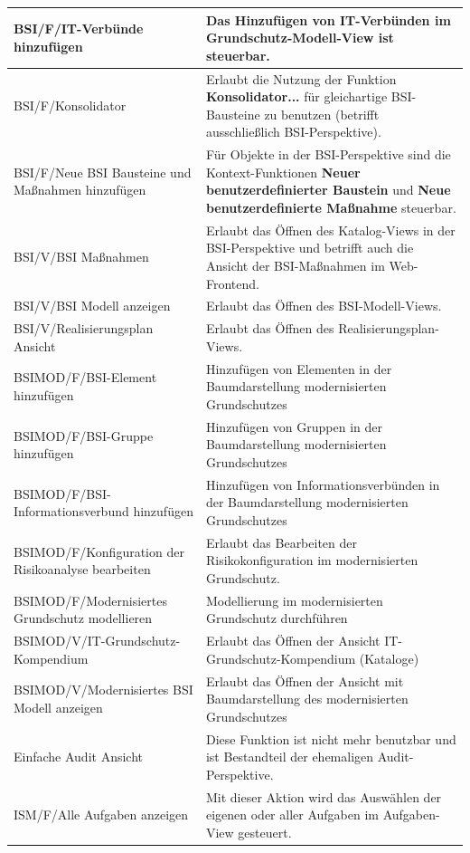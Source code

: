 \documentclass[a4paper,10pt]{book}
\begin{document}
\begin{longtable}{| p{5cm} | p{6cm} |}
BSI/F/IT-Verbünde hinzufügen & Das Hinzufügen von IT-Verbünden im
Grundschutz-Modell-View ist steuerbar. \\[10pt] \hline
BSI/F/Konsolidator & Erlaubt die Nutzung der Funktion \textbf{Konsolidator...}
für gleichartige BSI-Bausteine zu benutzen (betrifft ausschließlich
BSI-Perspektive). \\[10pt] \hline
BSI/F/Neue BSI Bausteine und Maßnahmen hinzufügen & Für Objekte in der
BSI-Perspektive sind die Kontext-Funktionen \textbf{Neuer benutzerdefinierter
Baustein} und \textbf{Neue benutzerdefinierte Maßnahme} steuerbar. \\[10pt]
\hline
BSI/V/BSI Maßnahmen & Erlaubt das Öffnen des Katalog-Views in der
BSI-Perspektive und betrifft auch die Ansicht der BSI-Maßnahmen im
Web-Frontend. \\[10pt] \hline
BSI/V/BSI Modell anzeigen & Erlaubt das Öffnen des BSI-Modell-Views. \\[10pt]
\hline
BSI/V/Realisierungsplan Ansicht & Erlaubt das Öffnen des
Realisierungsplan-Views. \\[10pt] \hline
BSIMOD/F/BSI-Element hinzufügen & Hinzufügen von Elementen in der Baumdarstellung modernisierten Grundschutzes \\[10pt] \hline
BSIMOD/F/BSI-Gruppe hinzufügen & Hinzufügen von Gruppen in der Baumdarstellung modernisierten Grundschutzes \\[10pt] \hline
BSIMOD/F/BSI-Informationsverbund hinzufügen & Hinzufügen von Informationsverbünden in der Baumdarstellung modernisierten Grundschutzes \\[10pt] \hline
BSIMOD/F/Konfiguration der Risikoanalyse bearbeiten & Erlaubt das Bearbeiten der Risikokonfiguration im modernisierten Grundschutz. \\[10pt] \hline
BSIMOD/F/Modernisiertes Grundschutz modellieren & Modellierung im modernisierten Grundschutz durchführen \\[10pt] \hline
BSIMOD/V/IT-Grundschutz-Kompendium & Erlaubt das Öffnen der Ansicht IT-Grundschutz-Kompendium (Kataloge) \\[10pt] \hline
BSIMOD/V/Modernisiertes BSI Modell anzeigen & Erlaubt das Öffnen der Ansicht mit Baumdarstellung des modernisierten Grundschutzes \\[10pt] \hline
Einfache Audit Ansicht & Diese Funktion ist nicht mehr benutzbar und ist
Bestandteil der ehemaligen Audit-Perspektive. \\[10pt] \hline
ISM/F/Alle Aufgaben anzeigen & Mit dieser Aktion wird das Auswählen der eigenen
oder aller Aufgaben im Aufgaben-View gesteuert. \\[10pt] \hline

\end{longtable}
\end{document}
